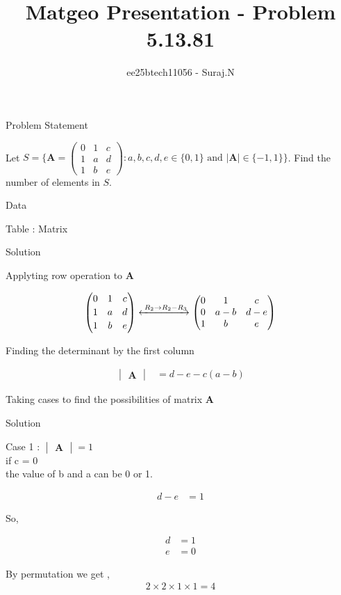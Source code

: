 \documentclass{beamer}
\title{Matgeo Presentation - Problem 5.13.81}
\author{ee25btech11056 - Suraj.N}
\numberwithin{equation}{section}
\theoremstyle{remark}
\newcommand{\myvec}[1]{\ensuremath{\begin{pmatrix}#1\end{pmatrix}}}
\newcommand{\mydet}[1]{\ensuremath{\begin{vmatrix}#1\end{vmatrix}}}
\let\vec\mathbf
\begin{document}
\begin{frame}
  \titlepage
\end{frame}

\begin{frame}{Problem Statement}

Let \(S=\{\vec{A}=\myvec{0 & 1 & c\\[2pt] 1 & a & d\\[2pt] 1 & b & e} : a,b,c,d,e\in\{0,1\}\text{ and }|\vec{A}|\in\{-1,1\}\}\).
Find the number of elements in \(S\).

\end{frame}


\begin{frame}{Data}

\begin{table}[h!]
  \centering
  
  \caption*{Table : Matrix}
  \label{5.13.81}
\end{table}

\end{frame}

\begin{frame}{Solution}

Applyting row operation to $\vec{A}$

\begin{align}
\myvec{0 & 1 & c\\[2pt] 1 & a & d\\[2pt] 1 & b & e}
\xleftrightarrow{\;R_2 \to R_2 - R_3}
\myvec{0 & 1 & c\\0 & a - b & d - e\\1 & b & e}
\end{align}

Finding the determinant by the first column 

\begin{align}
  \mydet{\vec{A}} &= d - e - c(a - b)
\end{align}

Taking cases to find the possibilities of matrix $\vec{A}$

\end{frame}

\begin{frame}{Solution}

Case 1 : $\mydet{\vec{A}}=1$ \\

if c = 0 \\
the value of b and a can be 0 or 1.

\begin{align}
d - e &= 1
\end{align}

So,

\begin{align}
d &= 1 \\  
e &= 0
\end{align}

By permutation we get ,\\

\begin{align}
2 \times 2 \times 1 \times 1 = 4
\end{align}

\end{frame}
\end{document}
